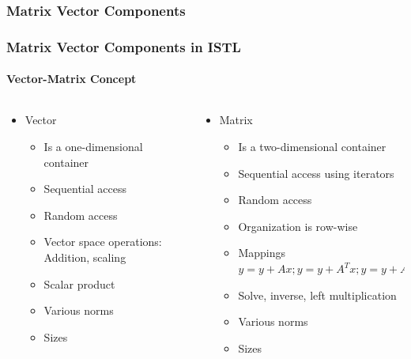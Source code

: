 \subsubsection{Matrix Vector Components}
\label{sec:matr-vect-comp}
\begin{frame}
\frametitle<presentation>{Matrix Vector Components in
  ISTL}
 \framesubtitle{Vector-Matrix Concept}
\begin{columns}[t]
\begin{column}{0.5\textwidth}
\begin{itemize}
\item Vector
\begin{itemize}
\item Is a one-dimensional container
\item Sequential access
\item Random access
\item Vector space operations: Addition, scaling
\item Scalar product
\item Various norms
\item Sizes
\end{itemize}
\end{itemize}
\end{column}
\pause
\begin{column}{0.5\textwidth}
\begin{itemize}
\item Matrix
\begin{itemize}
\item Is a two-dimensional container
\item Sequential access using iterators
\item Random access
\item Organization is row-wise
\item Mappings $y = y+Ax; y = y+A^Tx; y = y+A^Hx;$
\item Solve, inverse, left multiplication
\item Various norms
\item Sizes
\end{itemize}
\end{itemize}
\end{column}
\end{columns}
\end{frame}
